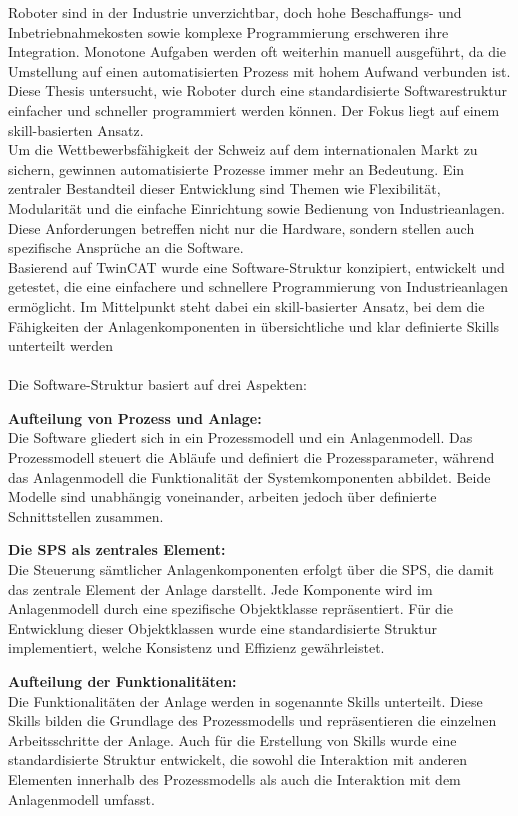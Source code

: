 Roboter sind in der Industrie unverzichtbar, doch hohe Beschaffungs- und Inbetriebnahmekosten sowie komplexe Programmierung erschweren ihre Integration. Monotone Aufgaben werden oft weiterhin manuell ausgeführt, da die Umstellung auf einen automatisierten Prozess mit hohem Aufwand verbunden ist. Diese Thesis untersucht, wie Roboter durch eine standardisierte Softwarestruktur einfacher und schneller programmiert werden können. Der Fokus liegt auf einem skill-basierten Ansatz.
\\
Um die Wettbewerbsfähigkeit der Schweiz auf dem internationalen Markt zu sichern, gewinnen automatisierte Prozesse immer mehr an Bedeutung. Ein zentraler Bestandteil dieser Entwicklung sind Themen wie Flexibilität, Modularität und die einfache Einrichtung sowie Bedienung von Industrieanlagen. Diese Anforderungen betreffen nicht nur die Hardware, sondern stellen auch spezifische Ansprüche an die Software.
\\
Basierend auf TwinCAT wurde eine Software-Struktur konzipiert, entwickelt und getestet, die eine einfachere und schnellere Programmierung von Industrieanlagen ermöglicht. Im Mittelpunkt steht dabei ein skill-basierter Ansatz, bei dem die Fähigkeiten der Anlagenkomponenten in übersichtliche und klar definierte Skills unterteilt werden
\\
\\
Die Software-Struktur basiert auf drei Aspekten:

\textbf{Aufteilung von Prozess und Anlage:} \vspace{2mm} 
\\
Die Software gliedert sich in ein Prozessmodell und ein Anlagenmodell. Das Prozessmodell steuert die Abläufe und definiert die Prozessparameter, während das Anlagenmodell die Funktionalität der Systemkomponenten abbildet. Beide Modelle sind unabhängig voneinander, arbeiten jedoch über definierte Schnittstellen zusammen.

\textbf{Die SPS als zentrales Element:} \vspace{2mm} 
\\
Die Steuerung sämtlicher Anlagenkomponenten erfolgt über die SPS, die damit das zentrale Element der Anlage darstellt. Jede Komponente wird im Anlagenmodell durch eine spezifische Objektklasse repräsentiert. Für die Entwicklung dieser Objektklassen wurde eine standardisierte Struktur implementiert, welche Konsistenz und Effizienz gewährleistet.

\textbf{Aufteilung der Funktionalitäten:} \vspace{2mm} 
\\
Die Funktionalitäten der Anlage werden in sogenannte Skills unterteilt. Diese Skills bilden die Grundlage des Prozessmodells und repräsentieren die einzelnen Arbeitsschritte der Anlage. Auch für die Erstellung von Skills wurde eine standardisierte Struktur entwickelt, die sowohl die Interaktion mit anderen Elementen innerhalb des Prozessmodells als auch die Interaktion mit dem Anlagenmodell umfasst.
